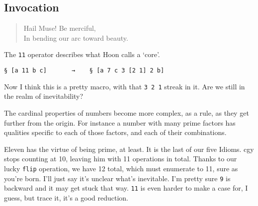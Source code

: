 \documentclass[twoside]{article}
\begin{document}
\subsection{Invocation}

\begin{quote}
Hail Muse! Be merciful, \\
In bending our arc toward beauty.
\end{quote}

The \texttt{11} operator describes what Hoon calls a `core'.

\begin{lstlisting}[style=listingcode]
§ [a 11 b c]       →    § [a 7 c 3 [2 1] 2 b]
\end{lstlisting}

\noindent
Now I think this is a pretty macro, with that \texttt{3 2 1} streak in it.  Are we still in the realm of inevitability?

The cardinal properties of numbers become more complex, as a rule, as they get further from the origin. For instance a number with many prime factors has qualities specific to each of those factors, and each of their combinations. %

Eleven has the virtue of being prime, at least. It is the last of our five Idioms. %
cgy stops counting at 10, leaving him with 11 operations in total. Thanks to our lucky \texttt{flip} operation, we have 12 total, which must enumerate to 11, sure as you're born.
%
I'll just say it's unclear what's inevitable. I'm pretty sure \texttt{9} is backward and it may get stuck that way. \texttt{11} is even harder to make a case for, I guess, but trace it, it's a good reduction.
\end{document}
